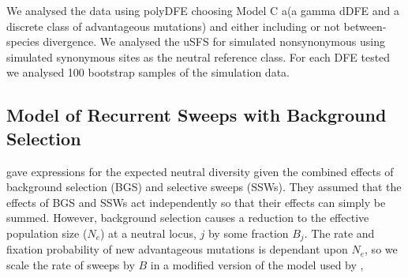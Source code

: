 \documentclass[11pt]{article}
\begin{document}
	 We analysed the data using polyDFE choosing Model C a(a gamma dDFE and a discrete class of advantageous mutations) and either including or not  between-species divergence. We analysed the uSFS for simulated nonsynonymous using simulated synonymous sites as the neutral reference class. For each DFE tested we analysed 100 bootstrap samples of the simulation data.
 
 	
	\subsection*{Model of Recurrent Sweeps with Background Selection}

	
	\cite{RN323} gave expressions for the expected neutral diversity given the combined effects of background selection (BGS) and selective sweeps (SSWs). They assumed that the effects of BGS and SSWs act independently so that their effects can simply be summed. However, background selection causes a reduction to the effective population size ($N_e$) at a neutral locus, $j$ by some fraction $B_j$. The rate and fixation probability of new advantageous mutations is dependant upon $N_e$, so we scale the rate of sweeps by $B$ in a modified version of the model used by \cite{RN323},
	
\end{document}
